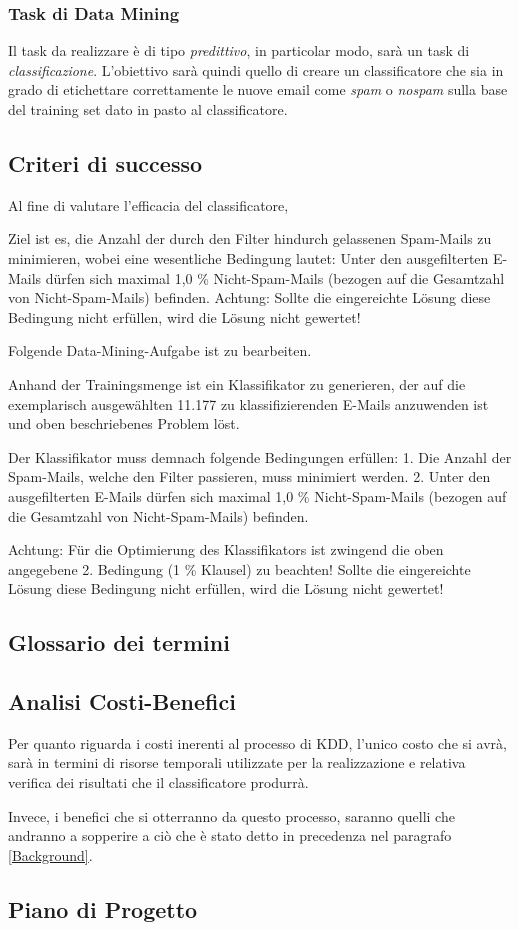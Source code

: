 \subsubsection{Task di Data Mining}
	Il task da realizzare è di tipo \textit{predittivo}, in particolar modo, sarà un task di \textit{classificazione}. L'obiettivo sarà quindi quello di creare un classificatore che sia in grado di etichettare correttamente le nuove email come \textit{spam} o \textit{nospam} sulla base del training set dato in pasto al classificatore. 
\subsection{Criteri di successo}
	Al fine di valutare l'efficacia del classificatore, 
	
	
	Ziel ist es, die Anzahl der durch den Filter hindurch gelassenen Spam-Mails zu minimieren, wobei eine wesentliche Bedingung lautet:
	Unter den ausgefilterten E-Mails dürfen sich maximal 1,0 \% Nicht-Spam-Mails (bezogen auf die Gesamtzahl von Nicht-Spam-Mails) befinden. Achtung: Sollte die eingereichte Lösung diese Bedingung nicht erfüllen, wird die Lösung nicht gewertet!
	
	Folgende Data-Mining-Aufgabe ist zu bearbeiten.
	
	Anhand der Trainingsmenge ist ein Klassifikator zu generieren,
	der auf die exemplarisch ausgewählten 11.177 zu klassifizierenden
	E-Mails anzuwenden ist und oben beschriebenes Problem löst.
	
	Der Klassifikator muss demnach folgende
	Bedingungen erfüllen:
	1. Die Anzahl der Spam-Mails, welche den Filter passieren,
	muss minimiert werden.
	2. Unter den ausgefilterten E-Mails dürfen sich maximal 1,0 \%
	Nicht-Spam-Mails (bezogen auf die Gesamtzahl von Nicht-Spam-Mails)
	befinden.
	
	Achtung: Für die Optimierung des Klassifikators ist zwingend
	die oben angegebene 2. Bedingung (1 \% Klausel) zu
	beachten! Sollte die eingereichte Lösung diese Bedingung
	nicht erfüllen, wird die Lösung nicht gewertet!

\subsection{Glossario dei termini}

\subsection{Analisi Costi-Benefici}

Per quanto riguarda i costi inerenti al processo di KDD, l'unico costo che si avrà, sarà in termini di risorse temporali utilizzate per la realizzazione e relativa verifica dei risultati che il classificatore produrrà.

Invece, i benefici che si otterranno da questo processo, saranno quelli che andranno a sopperire a ciò che è stato detto in precedenza nel paragrafo \ref{Background}.


\subsection{Piano di Progetto}